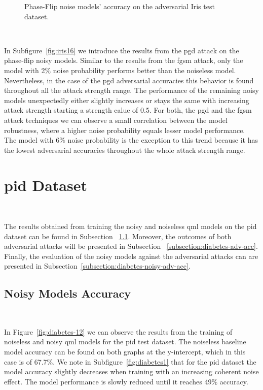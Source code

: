 \begin{figure}[!h]
  \caption{Phase-Flip noise models' accuracy on the adversarial Iris test dataset.}
  \label{fig:iris-1516}
\end{figure} \

In Subfigure~\ref{fig:iris16} we introduce the results from the \ac{pgd}
attack on the phase-flip noisy models. Similar to the results from the
\ac{fgsm} attack, only the model with 2\% noise probability performs
better than the noiseless model. Nevertheless, in the case of the \ac{pgd}
adversarial accuracies this behavior is found throughout all the attack
strength range. The performance of the remaining noisy models unexpectedly
either slightly increases or stays the same with increasing attack strength
starting a strength calue of 0.5. For both, the \ac{pgd} and the
\ac{fgsm} attack techniques we can observe a small correlation between the
model robustness, where a higher noise probability equals lesser model
performance. The model with 6\% noise probability is the exception to
this trend because it has the lowest adversarial accuracies throughout
the whole attack strength range. \

\section{\acl{pid} Dataset}\label{section:diabetes-eval} \

The results obtained from training the noisy and noiseless
\ac{qml} models on the \ac{pid} dataset can be found in Subsection
~\ref{subsection:diabetes-noisy-acc}. Moreover, the outcomes
of both adversarial attacks will be presented in Subsection
~\ref{subsection:diabetes-adv-acc}. Finally, the evaluation
of the noisy models against the adversarial attacks can
are presented in Subsection~\ref{subsection:diabetes-noisy-adv-acc}. \

\subsection{Noisy Models Accuracy}\label{subsection:diabetes-noisy-acc} \

In Figure~\ref{fig:diabetes-12} we can observe the results
from the training of noiseless and noisy \ac{qml} models
for the \ac{pid} test dataset. The noiseless baseline model accuracy
can be found on both graphs at the y-intercept, which in
this case is of 67.7\%. We note in Subfigure~\ref{fig:diabetes1}
that for the \ac{pid} dataset the model accuracy slightly decreases
when training with an increasing coherent noise effect. The model
performance is slowly reduced until it reaches 49\% accuracy. \


